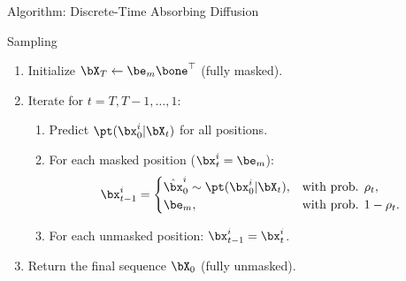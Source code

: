 \documentclass{beamer}
\begin{document}
\begin{frame}{Algorithm: Discrete-Time Absorbing Diffusion}
	\begin{block}{Sampling}
		\begin{enumerate}
			\item Initialize $\bX_T \leftarrow \be_m \bone^\top$ (fully masked).
			\item Iterate for $t = T, T-1, \ldots, 1$:
			\begin{enumerate}
				\item Predict $\pt(\bx_0^i | \bX_t)$ for all positions.
				\item For each masked position ($\bx_t^i = \be_m$):
				\vspace{-0.3cm}
				\[
					\bx_{t-1}^i =
					\begin{cases}
						\hat\bx_0^i \sim \pt(\bx_0^i | \bX_t), & \text{with prob. } \rho_t,\\
						\be_m, & \text{with prob. } 1-\rho_t.
					\end{cases}
				\]
				\vspace{-0.5cm}
				\item For each unmasked position: $\bx_{t-1}^i = \bx_t^i$.
			\end{enumerate}
			\item Return the final sequence $\bX_0$ (fully unmasked).
		\end{enumerate}
	\end{block}
\end{frame}
\end{document}
